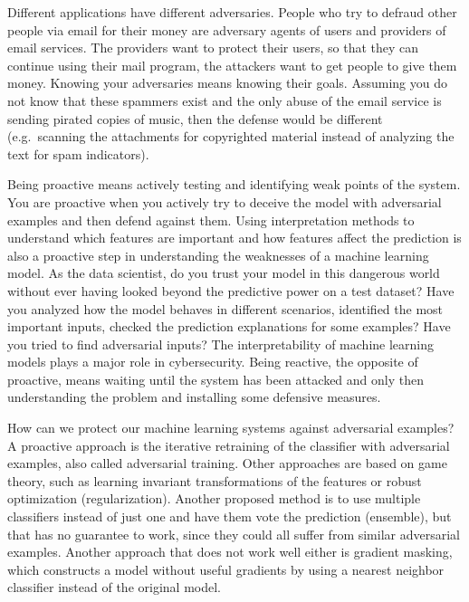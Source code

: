 \documentclass[
  10pt,
]{scrbook}
\begin{document}
Different applications have different adversaries.
People who try to defraud other people via email for their money are adversary agents of users and providers of email services.
The providers want to protect their users, so that they can continue using their mail program, the attackers want to get people to give them money.
Knowing your adversaries means knowing their goals.
Assuming you do not know that these spammers exist and the only abuse of the email service is sending pirated copies of music, then the defense would be different (e.g.~scanning the attachments for copyrighted material instead of analyzing the text for spam indicators).

Being proactive means actively testing and identifying weak points of the system.
You are proactive when you actively try to deceive the model with adversarial examples and then defend against them.
Using interpretation methods to understand which features are important and how features affect the prediction is also a proactive step in understanding the weaknesses of a machine learning model.
As the data scientist, do you trust your model in this dangerous world without ever having looked beyond the predictive power on a test dataset?
Have you analyzed how the model behaves in different scenarios, identified the most important inputs, checked the prediction explanations for some examples?
Have you tried to find adversarial inputs?
The interpretability of machine learning models plays a major role in cybersecurity.
Being reactive, the opposite of proactive, means waiting until the system has been attacked and only then understanding the problem and installing some defensive measures.

How can we protect our machine learning systems against adversarial examples?
A proactive approach is the iterative retraining of the classifier with adversarial examples, also called adversarial training.
Other approaches are based on game theory, such as learning invariant transformations of the features or robust optimization (regularization).
Another proposed method is to use multiple classifiers instead of just one and have them vote the prediction (ensemble), but that has no guarantee to work, since they could all suffer from similar adversarial examples.
Another approach that does not work well either is gradient masking, which constructs a model without useful gradients by using a nearest neighbor classifier instead of the original model.
\end{document}
